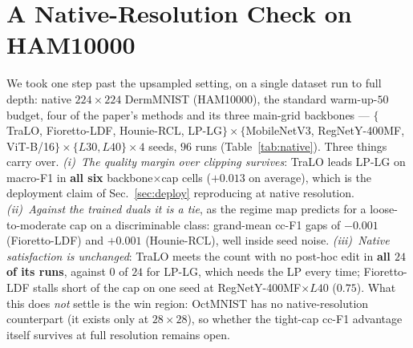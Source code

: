 \documentclass[10pt]{article}
\begin{document}
\section{A Native-Resolution Check on HAM10000}
\label{app:native}

{
We took one step past the upsampled setting, on a single dataset run to full depth:
native $224{\times}224$ DermMNIST (HAM10000), the standard warm-up-$50$ budget,
{four of the paper's
methods and its three main-grid backbones} --- $\{$TraLO, Fioretto-LDF, Hounie-RCL, LP-LG$\}
\times \{$MobileNetV3, RegNetY-400MF, ViT-B/16$\} \times \{L30, L40\} \times 4$ seeds,
$96$ runs (Table~\ref{tab:native}). Three things carry over. \emph{(i)~The quality margin
over clipping survives}: TraLO leads LP-LG on macro-F1 in \textbf{all six}
backbone$\times$cap cells ($+0.013$ on average), which is the deployment claim of
Sec.~\ref{sec:deploy} reproducing at native resolution. \emph{(ii)~Against the trained
duals it is a tie}, as the regime map predicts for a loose-to-moderate cap on a
discriminable class: grand-mean cc-F1 gaps of $-0.001$ (Fioretto-LDF) and $+0.001$
(Hounie-RCL), well inside seed noise. \emph{(iii)~Native satisfaction is unchanged}:
TraLO meets the count with no post-hoc edit in \textbf{all $24$ of its runs}, against
$0$ of $24$ for LP-LG, which needs the LP every time; Fioretto-LDF stalls short of the
cap on one seed at RegNetY-400MF$\times L40$ ($0.75$). What this does \emph{not} settle
is the win region: OctMNIST has no native-resolution counterpart (it exists only at
$28{\times}28$), so whether the tight-cap cc-F1 advantage itself survives at full
resolution remains open.}
\end{document}
